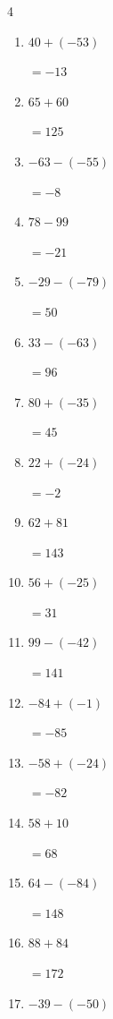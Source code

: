 \begin{multicols}{4}
\begin{enumerate}
        $=151$

  \item $40+(-53)$

        $=-13$

  \item $65+60$

        $=125$

  \item $-63-(-55)$

        $=-8$

  \item $78-99$

        $=-21$

  \item $-29-(-79)$

        $=50$

  \item $33-(-63)$

        $=96$

\columnbreak %

  \item $80+(-35)$

        $=45$

  \item $22+(-24)$

        $=-2$

  \item $62+81$

        $=143$

  \item $56+(-25)$

        $=31$

  \item $99-(-42)$

        $=141$

  \item $-84+(-1)$

        $=-85$

  \item $-58+(-24)$

        $=-82$

  \item $58+10$

        $=68$

  \item $64-(-84)$

        $=148$

  \item $88+84$

        $=172$

  \item $-39-(-50)$


\end{enumerate}
\end{multicols}
